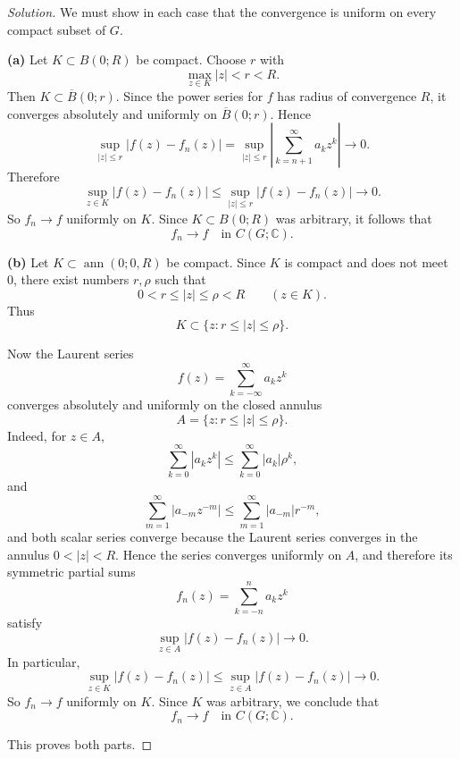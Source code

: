 \documentclass[12pt, a4paper]{report}
\theoremstyle{spaced}
\begin{document}
\begin{proof}[Solution]
	We must show in each case that the convergence is uniform on every compact subset of \(G\).

	\medskip
	\textbf{(a)} Let \(K\subset B(0;R)\) be compact. Choose \(r\) with
	\[
		\max_{z\in K}|z|<r<R.
	\]
	Then \(K\subset \overline{B}(0;r)\). Since the power series for \(f\) has radius of convergence \(R\), it converges absolutely and uniformly on \(\overline{B}(0;r)\). Hence
	\[
		\sup_{|z|\le r}\left|f(z)-f_n(z)\right|
		=
		\sup_{|z|\le r}\left|\sum_{k=n+1}^\infty a_k z^k\right|
		\to 0.
	\]
	Therefore
	\[
		\sup_{z\in K}|f(z)-f_n(z)|
		\le
		\sup_{|z|\le r}|f(z)-f_n(z)|
		\to 0.
	\]
	So \(f_n\to f\) uniformly on \(K\). Since \(K\subset B(0;R)\) was arbitrary, it follows that
	\[
		f_n\to f \quad \text{in } C(G;\mathbb C).
	\]

	\medskip
	\textbf{(b)} Let \(K\subset \operatorname{ann}(0;0,R)\) be compact. Since \(K\) is compact and does not meet \(0\), there exist numbers \(r,\rho\) such that
	\[
		0<r\le |z|\le \rho<R \qquad (z\in K).
	\]
	Thus
	\[
		K\subset \{z: r\le |z|\le \rho\}.
	\]

	Now the Laurent series
	\[
		f(z)=\sum_{k=-\infty}^{\infty} a_k z^k
	\]
	converges absolutely and uniformly on the closed annulus
	\[
		A=\{z: r\le |z|\le \rho\}.
	\]
	Indeed, for \(z\in A\),
	\[
		\sum_{k=0}^\infty |a_k z^k|
		\le \sum_{k=0}^\infty |a_k|\rho^k,
	\]
	and
	\[
		\sum_{m=1}^\infty |a_{-m} z^{-m}|
		\le \sum_{m=1}^\infty |a_{-m}|r^{-m},
	\]
	and both scalar series converge because the Laurent series converges in the annulus \(0<|z|<R\). Hence the series converges uniformly on \(A\), and therefore its symmetric partial sums
	\[
		f_n(z)=\sum_{k=-n}^{n} a_k z^k
	\]
	satisfy
	\[
		\sup_{z\in A}|f(z)-f_n(z)|\to 0.
	\]
	In particular,
	\[
		\sup_{z\in K}|f(z)-f_n(z)|
		\le
		\sup_{z\in A}|f(z)-f_n(z)|
		\to 0.
	\]
	So \(f_n\to f\) uniformly on \(K\). Since \(K\) was arbitrary, we conclude that
	\[
		f_n\to f \quad \text{in } C(G;\mathbb C).
	\]

	This proves both parts.
\end{proof}
\end{document}
